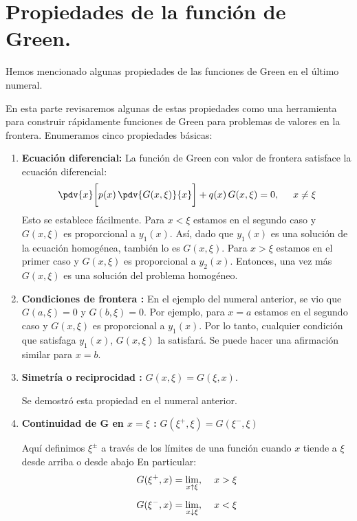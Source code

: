 \section{Propiedades de la función de Green.}

Hemos mencionado algunas propiedades de las funciones de Green en el último numeral.
\par
En esta parte revisaremos algunas de estas propiedades como una herramienta para construir rápidamente funciones de Green para problemas de valores en la frontera. Enumeramos cinco propiedades básicas:
\begin{enumerate}
\item \textbf{Ecuación diferencial: } La función de Green con valor de frontera satisface la ecuación diferencial:
\begin{align*}
\pdv{x} \bigg[ p (x) \, \pdv{G (x, \xi)}{x} \bigg] + q (x) \, G (x, \xi) = 0, \hspace{0.5cm} x \neq \xi
\end{align*}
Esto se establece fácilmente. Para $x < \xi$ estamos en el  segundo caso y $G (x, \xi)$ es proporcional a $y_{1} (x)$. Así, dado que $y_{1} (x)$ es una solución de la ecuación homogénea, también lo es $G (x, \xi)$. Para $x > \xi$ estamos en el primer caso y $G (x, \xi)$ es proporcional a $y_{2} (x)$. Entonces, una vez más $G (x, \xi)$ es una solución del problema homogéneo.
\item \textbf{Condiciones de frontera :} En el ejemplo del numeral anterior, se vio que $G (a, \xi) = 0$ y $G (b, \xi) = 0$. Por ejemplo, para $x = a$ estamos en el segundo caso y $G (x, \xi)$ es proporcional a $y_{1} (x)$. Por lo tanto, cualquier condición que satisfaga $y_{1} (x)$, $G (x, \xi)$ la satisfará. Se puede hacer una afirmación similar para $x = b$.
\item \textbf{Simetría o reciprocidad :} $G (x, \xi) = G (\xi, x)$.
\par
\noindent
Se demostró esta propiedad en el numeral anterior.
\item \textbf{Continuidad de $\mathbf{G}$ en $x = \xi$ :} $G (\xi^{+}, \xi) = G (\xi^{-}, \xi)$
\par
\noindent
Aquí definimos $\xi^{\pm}$ a través de los límites de una función cuando $x$ tiende a $\xi$ desde arriba o desde abajo En particular:
\begin{align*}
G (\xi^{+}, x) &= \lim_{x \uparrow \xi}, \hspace{0.4cm} x > \xi \\[0.5em]
G (\xi^{-}, x) &= \lim_{x \downarrow \xi}, \hspace{0.4cm} x < \xi

\end{align*}
\end{enumerate}
